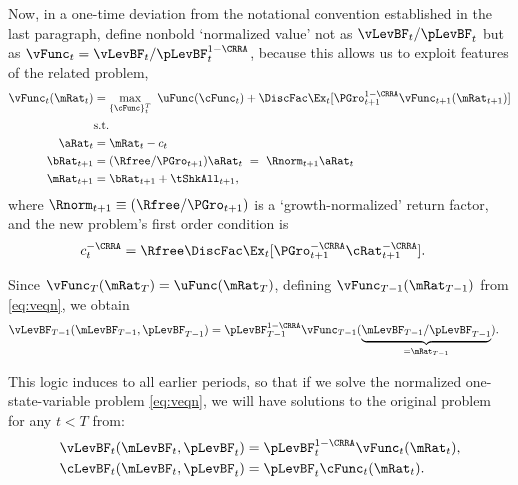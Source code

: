\documentclass[BufferStockTheory]{subfiles}
\begin{document}
\hypertarget{The-Related-Problem}{}
Now, in a one-time deviation from the notational convention established in the last paragraph, define nonbold `normalized value' not as $\vLevBF_{t}/\pLevBF_{t}$ but as $\vFunc_{t} = \vLevBF_{t}/\pLevBF_{t}^{1-\CRRA}$, because this allows us to exploit features of the related problem,
\begin{equation}\begin{gathered}\begin{aligned}
  \vFunc_{t}(\mRat_{t})  & = \max_{\{\cFunc\}_{t}^{T}}~  \uFunc(\cFunc_{t}) +\DiscFac \Ex_{t}[\PGro_{t+1}^{1-\CRRA}\vFunc_{t+1}({\mRat}_{t+1})] \notag \\
                         & \mbox{s.t.}  \label{eq:veqn} 
  \\ {\aRat}_{t}  & = \mRat_{t}-c_{t}  \notag
  \\ {\bRat}_{t+1}  & = (\Rfree/\PGro_{t+1})\aRat_{t}  ~ = ~ \Rnorm_{t+1}\aRat_{t}  \notag
  \\ \mRat_{t+1}  & = \bRat_{t+1}+\tShkAll_{t+1}  \notag, %
\end{aligned}\end{gathered}\end{equation}
where $\Rnorm_{t+1}\equiv (\Rfree/\PGro_{t+1})$ is a `growth-normalized' return factor, and the new problem's first order condition is
\begin{equation}\begin{gathered}\begin{aligned}
  c_{t}^{-\CRRA}  & = \Rfree \DiscFac \Ex_{t}[ {\PGro}_{t+1}^{-\CRRA} {\cRat}
                    _{t+1}^{-\CRRA}].  \label{eq:scaledeuler}
\end{aligned}\end{gathered}\end{equation}

Since $\vFunc_{T}(\mRat_{T}) = \uFunc(\mRat_{T})$, defining $\vFunc_{T-1}(\mRat_{T-1})$ from \eqref{eq:veqn}, we obtain
\begin{align*}
  \vLevBF_{T-1}(\mLevBF_{T-1},\pLevBF_{T-1})  & = \pLevBF_{T-1}^{1-\CRRA} \vFunc_{T-1}(\underbrace{\mLevBF_{T-1}/\pLevBF_{T-1}}_{=\mRat_{T-1}}).
\end{align*}

This logic induces to all earlier periods, so that if we solve the
normalized one-state-variable problem \eqref{eq:veqn}, we
will have solutions to the original problem for any $t<T$
from:
\begin{align*}
  \vLevBF_{t}(\mLevBF_{t},\pLevBF_{t})  & = \pLevBF_{t}^{1-\CRRA}\vFunc_{t}(\mRat_{t}),
  \\ \cLevBF_{t}(\mLevBF_{t},\pLevBF_{t})  & = \pLevBF_{t}\cFunc_{t}(\mRat_{t}).
\end{align*}
\end{document}

